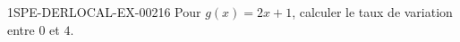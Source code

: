 \begin{exercice}{1SPE-DERLOCAL-EX-002}{1}{6}
Pour $g(x)=2x+1$, calculer le taux de variation entre $0$ et $4$.
\end{exercice}
